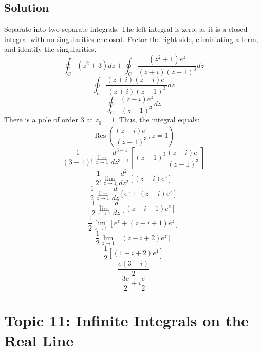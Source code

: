 \documentclass[12pt]{article}
\newcommand{\Res}{\operatorname{Res}}
\begin{document}
\subsection{Solution}
Separate into two separate integrals.  The left integral is zero, as it is a closed integral with no singularities enclosed.  Factor the right side, eliminiating a term, and identify the singularities.
\begin{equation}
	\oint_C (z^2+3)dz+\oint_C \frac{(z^2+1)e^z}{(z+i)(z-1)^3}dz
\end{equation}
\begin{equation}
	\oint_C \frac{(z+i)(z-i)e^z}{(z+i)(z-1)^3}dz
\end{equation}
\begin{equation}
	\oint_C \frac{(z-i)e^z}{(z-1)^3}dz
\end{equation}
There is a pole of order 3 at $z_0=1$.  Thus, the integral equals:
\begin{equation}
	\Res(\frac{(z-i)e^z}{(z-1)^3},z=1)
\end{equation}
\begin{equation}
	\frac{1}{(3-1)!}\lim_{z\to 1}\frac{d^{3-1}}{dz^{3-1}}[(z-1)^3\frac{(z-i)e^z}{(z-1)^3}]
\end{equation}
\begin{equation}
	\frac{1}{2!}\lim_{z\to 1}\frac{d^{2}}{dz^{2}}[(z-i)e^z]
\end{equation}
\begin{equation}
	\frac{1}{2}\lim_{z\to 1}\frac{d}{dz}[e^z+(z-i)e^z]
\end{equation}
\begin{equation}
	\frac{1}{2}\lim_{z\to 1}\frac{d}{dz}[(z-i+1)e^z]
\end{equation}
\begin{equation}
	\frac{1}{2}\lim_{z\to 1}[e^z+(z-i+1)e^z]
\end{equation}
\begin{equation}
	\frac{1}{2}\lim_{z\to 1}[(z-i+2)e^z]
\end{equation}
\begin{equation}
	\frac{1}{2}[(1-i+2)e^1]
\end{equation}
\begin{equation}
	\frac{e(3-i)}{2}
\end{equation}
\begin{equation}
	\frac{3e}{2}+i\frac{e}{2}
\end{equation}
\section{Topic 11: Infinite Integrals on the Real Line}
\end{document}
